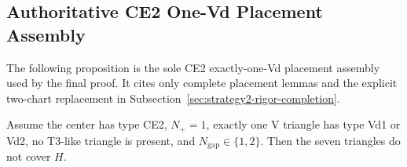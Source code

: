 \subsection{Authoritative CE2 One-Vd Placement Assembly}
\label{sec:strategy2-placement-assembly}

The following proposition is the sole CE2 exactly-one-Vd placement
assembly used by the final proof.  It cites only complete placement lemmas and
the explicit two-chart replacement in
Subsection~\ref{sec:strategy2-rigor-completion}.

\begin{proposition}
\label{prop:paper-ce2-one-vd-placements}
Assume the center has type CE2, $N_+=1$, exactly one V triangle has type Vd1
or Vd2, no T3-like triangle is present, and
$N_{\mathrm{gap}}\in\{1,2\}$.  Then the seven triangles do not cover $H$.
\end{proposition}

